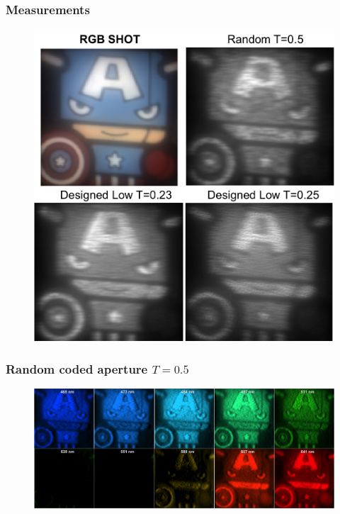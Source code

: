 \documentclass{beamer}
\begin{document}
\begin{frame}
\frametitle{Measurements}

\begin{figure}
\includegraphics[scale=0.45]{FiguresUpd/meas_all.png}
\end{figure}
\begin{center}
\end{center}
\end{frame}



\begin{frame}
\frametitle{Random coded aperture $T=0.5$}

\begin{figure}
\includegraphics[scale=0.25]{FiguresUpd/real_rand05.png}
\end{figure}
\begin{center}
\end{center}
\end{frame}
\end{document}
